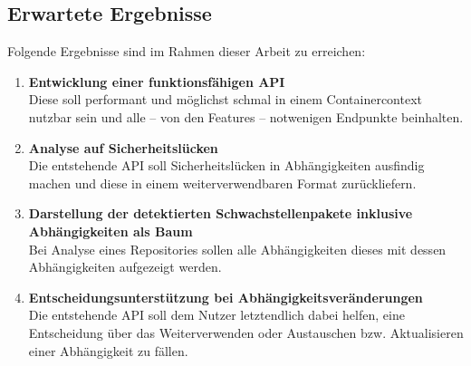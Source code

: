 \subsection{Erwartete Ergebnisse} \label{sec:Erwartete Ergebnisse}
    Folgende Ergebnisse sind im Rahmen dieser Arbeit zu erreichen:
    \begin{enumerate}
        \item \textbf{Entwicklung einer funktionsfähigen API} \\
            Diese soll performant und möglichst schmal in einem Containercontext nutzbar sein und alle -- von den Features -- notwenigen Endpunkte beinhalten.
        \item \textbf{Analyse auf Sicherheitslücken} \\
            Die entstehende API soll Sicherheitslücken in Abhängigkeiten ausfindig machen und diese in einem weiterverwendbaren Format zurückliefern.
        \item \textbf{Darstellung der detektierten Schwachstellenpakete inklusive Abhängigkeiten als Baum} \\
            Bei Analyse eines Repositories sollen alle Abhängigkeiten dieses mit dessen Abhängigkeiten aufgezeigt werden.
        \item \textbf{Entscheidungsunterstützung bei Abhängigkeitsveränderungen} \\
            Die entstehende API soll dem Nutzer letztendlich dabei helfen, eine Entscheidung über das Weiterverwenden oder Austauschen bzw. Aktualisieren einer Abhängigkeit zu fällen.
    \end{enumerate}

